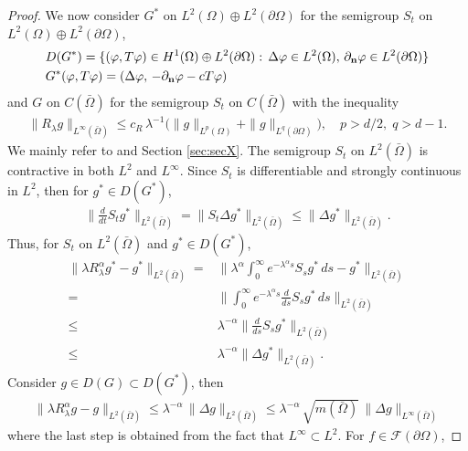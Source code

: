 \documentclass[11pt,a4paper]{article}
\begin{document}
\begin{proof}
We now consider $G^*$ on $L^2(\Omega) \oplus L^2(\partial \Omega)$ for the semigroup $S_t$ on $L^2(\Omega) \oplus L^2(\partial \Omega)$, 
\begin{align*}
& D(G^*)=\{(\varphi, T\varphi) \in H^1(\Omega) \oplus L^2(\partial \Omega) :\, \Delta \varphi \in L^2(\Omega),\, \partial_{\bf n}\varphi \in L^2(\partial \Omega)\}\\
& G^* (\varphi, T\varphi) = (\Delta \varphi, \, -\partial_{\bf n} \varphi - c T\varphi)
\end{align*}
and $G$ on $C(\bar{\Omega})$ for the semigroup $S_t$ on $C(\bar{\Omega})$ with the inequality
\begin{align}
\| R_{\lambda} g \| _{L^\infty (\bar{\Omega})} \leq c_R\, \lambda^{-1} \big( \| g\|_{L^p(\Omega)} + \| g\|_{L^q(\partial \Omega)} \big), \quad p>d/2, \; q>d-1.
\label{contractionR}
\end{align}
We mainly refer to \cite{AMPR03, ArendtSauter2022} and Section \ref{sec:secX}. The semigroup $S_t$ on $L^2(\bar{\Omega})$ is contractive in both $L^2$ and $L^\infty$. Since $S_t$ is differentiable and strongly continuous in $L^2$, then for $g^* \in D(G^*)$,
\begin{align}
\Big\| \frac{d}{d t} S_t g^* \Big\|_{L^2(\bar{\Omega})}  = \| S_t \Delta g^* \|_{L^2(\bar{\Omega})} \leq \| \Delta g^* \|_{L^2(\bar{\Omega})}.
\label{SGcommute}
\end{align}
Thus, for $S_t$ on $L^2(\bar{\Omega})$ and $g^* \in D(G^*)$,  
\begin{align*}
\| \lambda R^\alpha_\lambda g^* - g^* \|_{L^2(\bar{\Omega})} 
= & \Big\| \lambda^\alpha \int_0^\infty e^{-\lambda^\alpha s} S_s g^* \,ds - g^* \Big\|_{L^2(\bar{\Omega})}\\
= & \Big\| \int_0^\infty e^{-\lambda^\alpha s} \frac{d}{ds} S_s g^* \,ds \Big\|_{L^2(\bar{\Omega})} \\
\leq & \lambda^{-\alpha} \Big\| \frac{d}{ds} S_s g^* \Big\|_{L^2(\bar{\Omega})} \\
\leq & \lambda^{-\alpha} \|\Delta g^* \|_{L^2(\bar{\Omega})}.
\end{align*}
Consider $g \in D(G) \subset D(G^*)$, then
\begin{align}
\| \lambda R^\alpha_\lambda g - g \|_{L^2(\bar{\Omega})} \leq  \lambda^{-\alpha}\, \| \Delta g \|_{L^2(\bar{\Omega})} \leq \lambda^{-\alpha}\, \sqrt{m(\bar{\Omega})}\, \|\Delta g \|_{L^\infty(\bar{\Omega})}
\label{boundCOMMUTEg}
\end{align}
where the last step is obtained from the fact that $L^\infty \subset L^2$. For $f \in \mathcal{F}(\partial \Omega)$, 

\end{proof}
\end{document}
